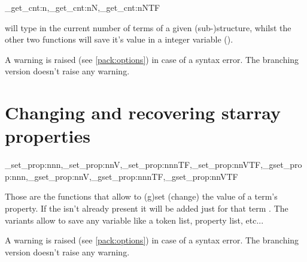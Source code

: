 \documentclass[10pt]{article}
\begin{document}
\begin{codedescribe}{\starray_get_cnt:n,\starray_get_cnt:nN,\starray_get_cnt:nNTF}
\begin{codesyntax}%
\end{codesyntax}
\end{codedescribe}
 will type in the current number of terms of a given (sub-)structure, whilst the other two functions will save it's value in a integer variable ().
\begin{tsremark}
A warning is raised (see \ref{pack:options}) in case of a  syntax error. The branching version doesn't raise any warning.
\end{tsremark}

\section{Changing and recovering starray properties}\label{pack:get/set}

\begin{codedescribe}{\starray_set_prop:nnn,\starray_set_prop:nnV,\starray_set_prop:nnnTF,\starray_set_prop:nnVTF,\starray_gset_prop:nnn,\starray_gset_prop:nnV,\starray_gset_prop:nnnTF,\starray_gset_prop:nnVTF}
\begin{codesyntax}%
\end{codesyntax}
\end{codedescribe}
Those are the functions that allow to (g)set (change) the value of a term's property. If the  isn't already present it will be added just for that term . The  variants allow to save any variable like a token list, property list, etc...
\begin{tsremark}
A warning is raised (see \ref{pack:options}) in case of a  syntax error. The branching version doesn't raise any warning.
\end{tsremark}
\end{document}
